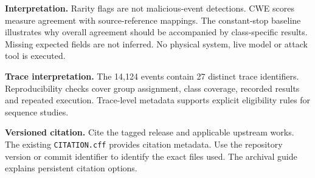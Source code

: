 \textbf{Interpretation.} Rarity flags are not malicious-event detections. CWE scores measure agreement with source-reference mappings. The constant-stop baseline illustrates why overall agreement should be accompanied by class-specific results. Missing expected fields are not inferred. No physical system, live model or attack tool is executed.

\textbf{Trace interpretation.} The 14,124 events contain 27 distinct trace identifiers. Reproducibility checks cover group assignment, class coverage, recorded results and repeated execution. Trace-level metadata supports explicit eligibility rules for sequence studies.

\textbf{Versioned citation.} Cite the tagged release and applicable upstream works. The existing \texttt{CITATION.cff} provides citation metadata. Use the repository version or commit identifier to identify the exact files used. The archival guide explains persistent citation options.
